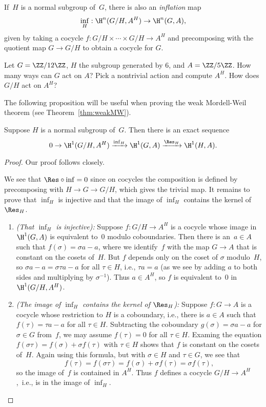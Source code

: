 If~$H$ is a normal subgroup of~$G$, there is also an \emph{inflation} map
\[
  \inf_H : \H^n(G/H, A^H) \to \H^n(G,A),
\]
given by taking a cocycle $f : G/H \times \cdots \times G/H \to A^H$
and precomposing with the quotient map $G\to G/H$ to
obtain a cocycle for $G$.

\begin{exercise}
  Let $G = \ZZ/12\ZZ$, $H$ the subgroup generated by $6$, and $A = \ZZ/5\ZZ$.
  How many ways can $G$ act on $A$? Pick a nontrivial action and compute $A^H$.
  How does $G/H$ act on $A^H$?
\end{exercise}

The following proposition will be useful when proving
the weak Mordell-Weil theorem (see Theorem~\ref{thm:weakMW}).
\begin{proposition}\label{prop:infres}
  Suppose $H$ is a normal subgroup of~$G$.
  Then there is an exact sequence
  \[
    0 \to \H^1(G/H, A^H)
    \xrightarrow{\inf_H} \H^1(G,A)
    \xrightarrow{\Res_H} \H^1(H,A).
  \]
\end{proposition}
\begin{proof}
  Our proof follows \cite[pg.~117]{serre:localfields} closely.

  We see that $\Res\circ \inf = 0$ since on cocycles the composition is
  defined by precomposing with $H\to G\to G/H$, which gives the trivial map.
  It remains to prove that $\inf_H$ is injective and that the image of $\inf_H$
  contains the kernel of $\Res_H$.
  \begin{enumerate}
    \item {\em (That $\inf_H$ is injective):}
    Suppose $f:G/H\to A^H$ is a cocycle whose image in $\H^1(G,A)$
    is equivalent to~$0$ modulo coboundaries. Then there is an~$a\in A$
    such that $f(\sigma) = \sigma a - a$, where we identify~$f$ with
    the map $G\to A$ that is constant on the cosets of~$H$. But $f$
    depends only on the coset of $\sigma$ modulo~$H$, so
    $\sigma a - a = \sigma \tau a - a$ for all $\tau \in H$, i.e.,
    $\tau a = a$ (as we see by adding $a$ to both sides and multiplying
    by $\sigma^{-1}$). Thus $a\in A^H$, so $f$ is equivalent to~$0$ in
    $\H^1(G/H,A^H)$.

    \item {\em (The image of $\inf_H$ contains the kernel of $\Res_H$):}
    Suppose $f:G\to A$ is a cocycle whose
    restriction to $H$ is a coboundary, i.e., there is $a\in A$ such
    that $f(\tau) = \tau a - a$ for all $\tau \in H$.
    Subtracting the coboundary $g(\sigma) = \sigma a - a$ for $\sigma\in G$
    from~$f$, we may assume $f(\tau) = 0$ for all $\tau \in H$.
    Examing the equation $f(\sigma\tau) = f(\sigma) + \sigma f(\tau)$
    with $\tau\in H$ shows that $f$ is constant on the cosets of~$H$.
    Again using this formula, but with $\sigma\in H$ and $\tau\in G$, we see
    that
    \[
      f(\tau) = f(\sigma \tau) = f(\sigma) + \sigma f(\tau) = \sigma f(\tau),
    \]
    so the image of~$f$ is contained in $A^H$.  Thus $f$ defines a cocycle
    $G/H \to A^H$,~i.e., is in the image of $\inf_H$.
  \end{enumerate}
\end{proof}

